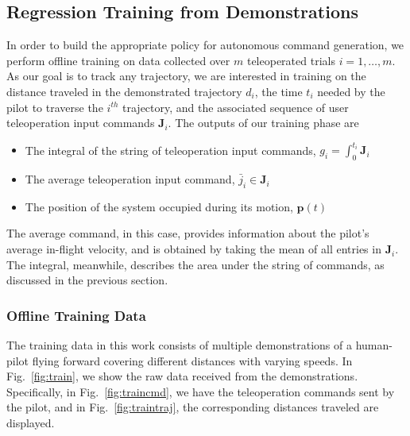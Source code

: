 \documentclass[letterpaper, 10 pt, conference]{ieeeconf}  %
\newcommand\NB[1]{$\spadesuit$\footnote{NB: #1}}
\begin{document}
\subsection{Regression Training from Demonstrations} \label{sec:train}
In order to build the appropriate policy for autonomous command generation, we perform offline training on data collected over $m$ teleoperated trials $i=1,\ldots,m$. As our goal is to track any trajectory, we are interested in training on the distance traveled in the demonstrated trajectory $d_i$, the time $t_i$ needed by the pilot to traverse the $i^{th}$ trajectory, and the associated sequence of user teleoperation input commands $\bm{J}_i$.
The outputs of our training phase are \begin{itemize} %
    \item The integral of the string of teleoperation input commands, $g_i = \int_0^{t_i}\bm{J}_i$
    \item The average teleoperation input command, $\bar{j}_i \in \bm{J}_i$
    \item The position of the system occupied during its motion, $\bm{p}(t)$
\end{itemize}
The average command, in this case, provides information about the pilot's average in-flight velocity, and is obtained by taking the mean of all entries in $\bm{J}_i$. The integral, meanwhile, describes the area under the string of commands, as discussed in the previous section.

\subsubsection{Offline Training Data}

The training data in this work consists of multiple demonstrations of a human-pilot flying forward covering different distances with varying speeds.
In Fig.~\ref{fig:train}, we show the raw data received from the demonstrations. Specifically, in Fig.~\ref{fig:traincmd}, we have the teleoperation commands sent by the pilot, and in Fig.~\ref{fig:traintraj}, the corresponding distances traveled are displayed.
\end{document}
